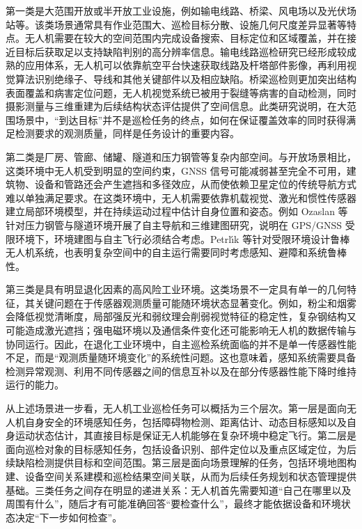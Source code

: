 第一类是大范围开放或半开放工业设施，例如输电线路、桥梁、风电场以及光伏场站等。该类场景通常具有作业范围大、巡检目标分散、设施几何尺度差异显著等特点。无人机需要在较大的空间范围内完成设备搜索、目标定位和区域覆盖，并在接近目标后获取足以支持缺陷判别的高分辨率信息。输电线路巡检研究已经形成较成熟的应用体系，无人机可以依靠航空平台快速获取线路及杆塔部件影像，再利用视觉算法识别绝缘子、导线和其他关键部件以及相应缺陷\cite{nguyen2018automatic,miao2020uav,zhouwq2024review}。桥梁巡检则更加突出结构表面覆盖和病害定位问题，无人机视觉系统已被用于裂缝等病害的自动检测，同时摄影测量与三维重建为后续结构状态评估提供了空间信息\cite{yeum2015vision,cha2017deep,morgenthal2014quality,ham2016visual,spencer2019advances}。此类研究说明，在大范围场景中，“到达目标”并不是巡检任务的终点，如何在保证覆盖效率的同时获得满足检测要求的观测质量，同样是任务设计的重要内容。

第二类是厂房、管廊、储罐、隧道和压力钢管等复杂内部空间。与开放场景相比，这类环境中无人机受到明显的空间约束，GNSS 信号可能减弱甚至完全不可用，建筑物、设备和管路还会产生遮挡和多径效应，从而使依赖卫星定位的传统导航方式难以单独满足要求\cite{nil2012review,scaramuzza2014vision,ozaslan2017autonomous}。在这类环境中，无人机需要依靠机载视觉、激光和惯性传感器建立局部环境模型，并在持续运动过程中估计自身位置和姿态。例如 Ozaslan 等针对压力钢管与隧道环境开展了自主导航和三维建图研究，说明在 GPS/GNSS 受限环境下，环境建图与自主飞行必须结合考虑\cite{ozaslan2017autonomous}。Petrl{\'\i}k 等针对受限环境设计鲁棒无人机系统，也表明复杂空间中的自主运行需要同时考虑感知、避障和系统鲁棒性\cite{petrlik2020robust}。

第三类是具有明显退化因素的高风险工业环境。这类场景不一定具有单一的几何特征，其关键问题在于传感器观测质量可能随环境状态显著变化。例如，粉尘和烟雾会降低视觉清晰度，局部强反光和弱纹理会削弱视觉特征的稳定性，复杂钢结构又可能造成激光遮挡；强电磁环境以及通信条件变化还可能影响无人机的数据传输与协同运行\cite{lvyang2019sense,zeng2016wireless,mozaffari2019tutorial}。因此，在退化工业环境中，自主巡检系统面临的并不是单一传感器性能不足，而是“观测质量随环境变化”的系统性问题。这也意味着，感知系统需要具备检测异常观测、利用不同传感器之间的信息互补以及在部分传感器性能下降时维持运行的能力。

从上述场景进一步看，无人机工业巡检任务可以概括为三个层次。第一层是面向无人机自身安全的环境感知任务，包括障碍物检测、距离估计、动态目标感知以及自身运动状态估计，其直接目标是保证无人机能够在复杂环境中稳定飞行。第二层是面向巡检对象的目标感知任务，包括设备识别、部件定位以及重点区域定位，为后续缺陷检测提供目标和空间范围。第三层是面向场景理解的任务，包括环境地图构建、设备空间关系建模和巡检结果空间关联，从而为后续任务规划和状态管理提供基础\cite{kanellakis2017survey,nex2014uav,tao2019digital}。三类任务之间存在明显的递进关系：无人机首先需要知道“自己在哪里以及周围有什么”，随后才有可能准确回答“要检查什么”，最终才能依据设备和环境状态决定“下一步如何检查”。

